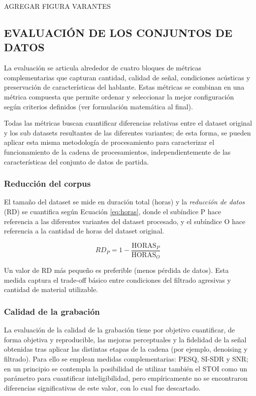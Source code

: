 AGREGAR FIGURA VARANTES


\subsection{EVALUACIÓN DE LOS CONJUNTOS DE DATOS}

La evaluación se articula alrededor de cuatro bloques de métricas complementarias que capturan cantidad, calidad de señal, condiciones acústicas y preservación de características del hablante. Estas métricas se combinan en una métrica compuesta que permite ordenar y seleccionar la mejor configuración según criterios definidos (ver formulación matemática al final). 

Todas las métricas buscan cuantificar diferencias relativas entre el dataset original y los sub datasets resultantes de las diferentes variantes; de esta forma, se pueden aplicar esta misma metodología de procesamiento para caracterizar el funcionamiento de la cadena de procesamientos, independientemente de las características del conjunto de datos de partida.

\subsubsection{Reducción del corpus}
El tamaño del dataset se mide en duración total (horas) y la \emph{reducción de datos} (RD) se cuantifica según Ecuación \ref{eq:horas}, donde el subíndice P hace referencia a las diferentes variantes del dataset procesado, y el subíndice O hace referencia a la cantidad de horas del dataset original.


\begin{equation}
\label{eq:horas}
RD_P = 1 - \frac{\mathrm{HORAS}_P}{\mathrm{HORAS}_O}
\end{equation}

Un valor de RD más pequeño es preferible (menos pérdida de datos). Esta medida captura el trade-off básico entre condiciones del filtrado agresivas y cantidad de material utilizable. 

\subsubsection{Calidad de la grabación}
La evaluación de la calidad de la grabación tiene por objetivo cuantificar, de forma objetiva y reproducible, las mejoras perceptuales y la fidelidad de la señal obtenidas tras aplicar las distintas etapas de la cadena (por ejemplo, denoising y filtrado). Para ello se emplean medidas complementarias: PESQ, SI-SDR y SNR; en un principio se contempla la posibilidad de utilizar también el STOI como un parámetro para cuantificar inteligibilidad, pero empíricamente no se encontraron diferencias significativas de este valor, con lo cual fue descartado. 

